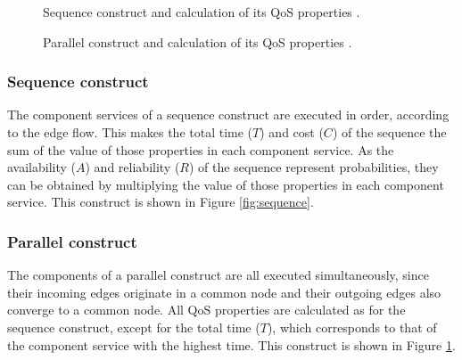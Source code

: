 \documentclass{llncs}
\begin{document}
\begin{figure}[h]
\centerline{
}
\caption{Sequence construct and calculation of its QoS properties
\cite{yu2013adaptive}.}
\label{fig:sequence}
\vspace{0.3cm}
\centerline{
}
\caption{Parallel construct and calculation of its QoS properties
\cite{yu2013adaptive}.}
\label{fig:parallel}
\end{figure}

\subsubsection{Sequence construct}
The component services of a sequence construct are executed in order, according to the edge flow. This makes the total time ($T$) and cost ($C$) of the sequence the sum of the value of those properties in each component service. As the availability ($A$) and reliability ($R$) of the sequence represent probabilities, they can be obtained by multiplying the value of those properties in each component service. This construct is shown in Figure \ref{fig:sequence}.
\subsubsection{Parallel construct} The components of a parallel construct are all executed simultaneously, since their incoming edges originate in a common node and their outgoing edges also converge to a common node. All QoS properties are calculated as for the sequence construct, except for the total time ($T$), which corresponds to that of the component service with the highest time. This construct is shown in Figure \ref{fig:parallel}.
\end{document}
